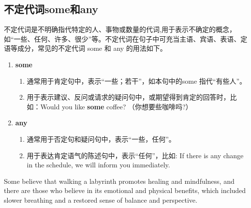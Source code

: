 \vspace{0.5cm}

\markword[\mbox]{{\Large\textcolor{red}{\( \rgroup \)}}}{\textcolor{red}{定从结束}}

\vspace{0.5cm}

\markword[\mbox]{\large\textcolor{blue}{\(\rgroup\)}}{\textcolor{blue}{宾从结束}}

\subsection{不定代词some和any}

不定代词是不明确指代特定的人、事物或数量的代词,用于表示不确定的概念，如“一些、任何、许多、很少”等。不定代词在句子中可充当主语、宾语、表语、定语等成分，常见的不定代词 some 和 any 的用法如下。
\begin{enumerate}
  \item \textbf{some}
        \begin{enumerate}
          \item 通常用于肯定句中，表示“一些；若干”，如本句中的some 指代“有些人”。
          \item 用于表示建议、反问或请求的疑问句中，或期望得到肯定的回答时，比如：Would you like \textbf{some} coffee? （你想要些咖啡吗?）
        \end{enumerate}
  \item \textbf{any}
        \begin{enumerate}
          \item 通常用于否定句和疑问句中，表示“一些，任何”。
          \item 用于表达肯定语气的陈述句中，表示“任何”，比如: If there is any change in the schedule, we will inform you immediately.
        \end{enumerate}
\end{enumerate}

Some believe that walking a labyrinth promotes healing and mindfulness, and there are those who believe in its emotional and physical benefits, which included slower breathing and a restored sense of balance and perspective.


